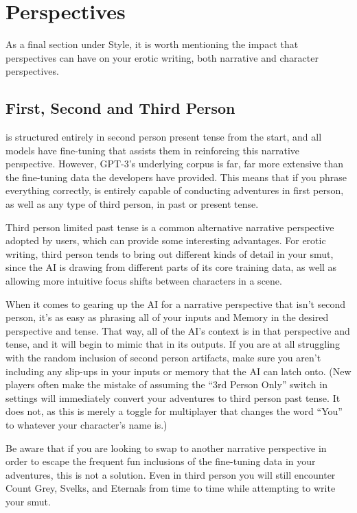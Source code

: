 ﻿\documentclass[Coomer-main.tex]{subfiles}
\begin{document}
\section{Perspectives}

As a final section under Style, it is worth mentioning the impact that perspectives can have on your erotic writing, both narrative and character perspectives.

\subsection{First, Second and Third Person}

\aid is structured entirely in second person present tense from the start, and all models have fine-tuning that assists them in reinforcing this narrative perspective.
However, GPT-3's underlying corpus is far, far more extensive than the fine-tuning data the developers have provided.
This means that if you phrase everything correctly, \aid is entirely capable of conducting adventures in first person, as well as any type of third person, in past or present tense.

Third person limited past tense is a common alternative narrative perspective adopted by \aid users, which can provide some interesting advantages.
For erotic writing, third person tends to bring out different kinds of detail in your smut, since the AI is drawing from different parts of its core training data, as well as allowing more intuitive focus shifts between characters in a scene.

When it comes to gearing up the AI for a narrative perspective that isn't second person, it's as easy as phrasing all of your inputs and Memory in the desired perspective and tense.
That way, all of the AI's context is in that perspective and tense, and it will begin to mimic that in its outputs.
If you are at all struggling with the random inclusion of second person artifacts, make sure you aren't including any slip-ups in your inputs or memory that the AI can latch onto. (New players often make the mistake of assuming the “3rd Person Only” switch in settings will immediately convert your adventures to third person past tense.
It does not, as this is merely a toggle for multiplayer that changes the word “You” to whatever your character’s name is.)

Be aware that if you are looking to swap to another narrative perspective in order to escape the frequent fun inclusions of the fine-tuning data in your adventures, this is not a solution.
Even in third person you will still encounter Count Grey, Svelks, and Eternals from time to time while attempting to write your smut.
\end{document}
